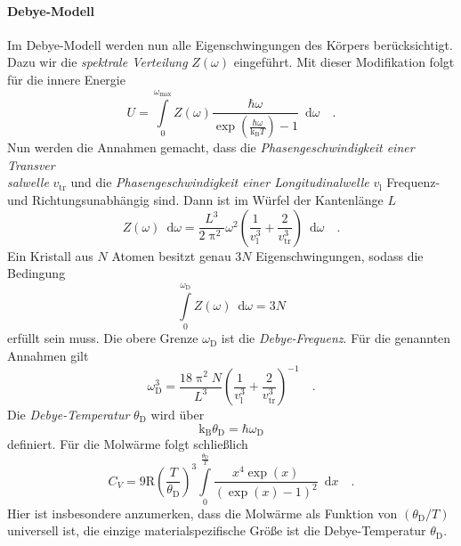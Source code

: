 \paragraph{Debye-Modell}
	Im Debye-Modell werden nun alle Eigenschwingungen des Körpers 
	berücksichtigt. Dazu wir die \textit{spektrale Verteilung} $Z(\omega)$ 
	eingeführt. Mit dieser Modifikation folgt für die innere Energie 
	\begin{equation}
	U= \int\limits_0^{\omega_\text{max}} Z(\omega)
	\frac{\hbar \omega}{
	\exp\left(\frac{\hbar \omega}{\text{k}_\text{B} T}\right)-1} 
	\,\,\, \text{d}\omega \quad .
	\end{equation}
	Nun werden die Annahmen gemacht, dass die \textit{Phasengeschwindigkeit 
	einer Transver\\salwelle} $v_\text{tr}$ und 
	die \textit{Phasengeschwindigkeit 
	einer Longitudinalwelle} $v_\text{l}$ Frequenz- und 
	Richtungsunabhängig sind. Dann ist im Würfel der Kantenlänge $L$
	\begin{equation}
	Z(\omega) \,\,\, \text{d}\omega = 
	\frac{L^3}{2 \uppi^2} \omega^2 \left( 
	\frac{1}{v_\text{l}^3} + \frac{2}{v_\text{tr}^3} \right)
	\,\,\, \text{d} \omega \quad .
	\end{equation}
	Ein Kristall aus $N$ Atomen besitzt genau $3N$ Eigenschwingungen, sodass 
	die Bedingung 
	\begin{equation}
	\int\limits_0^{\omega_\text{D}} Z(\omega) 
	\,\,\, \text{d} \omega
	= 3 N
	\end{equation}
	erfüllt sein muss. Die obere Grenze $\omega_\text{D}$ ist die 
	\textit{Debye-Frequenz}. Für die genannten Annahmen gilt 
	\begin{equation}
	\omega_\text{D}^3 = \frac{18 \uppi^2 N}{L^3} \left(
	\frac{1}{v_\text{l}^3} + \frac{2}{v_\text{tr}^3}
	\right)^{-1} \quad . \label{eq:theorie:debye_frequenz}
	\end{equation}
	Die \textit{Debye-Temperatur} $\theta_\text{D}$ wird über 
	\begin{equation}
	\text{k}_\text{B} \theta_\text{D} = \hbar \omega_\text{D} 
	\label{eq:theorie:debye_temperatur}
	\end{equation}
	definiert. Für die Molwärme folgt schließlich 
	\begin{equation}
	C_V = 9 \text{R} \left(\frac{T}{\theta_\text{D}}\right)^3
	 \int\limits_0^{\frac{\theta_\text{D}}{T}} 
	 \frac{x^4\exp(x)}{\left(\exp(x)-1\right)^2} \,\,\, \text{d}x
	 \quad .
	 \label{eq:theorie:C_Debye}
	\end{equation}
	Hier ist insbesondere anzumerken, dass die Molwärme als Funktion 
	von $(\theta_\text{D}/T)$ universell ist, die einzige materialspezifische 
	Größe ist die Debye-Temperatur $\theta_\text{D}$.
	
